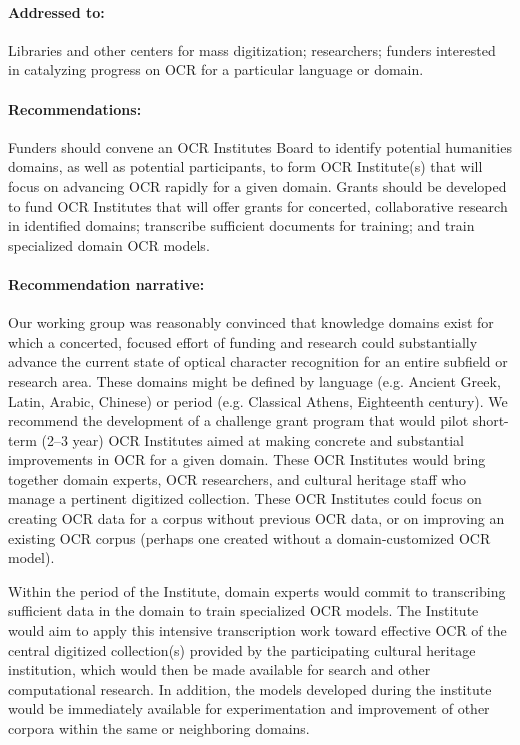 \documentclass[twoside,11pt]{report}
\begin{document}
\paragraph{Addressed to:} Libraries and other centers for mass digitization; researchers; funders interested in catalyzing progress on OCR for a particular language or domain.

\paragraph{Recommendations:} Funders should convene an OCR Institutes Board to identify potential humanities domains, as well as potential participants, to form OCR Institute(s) that will focus on advancing OCR rapidly for a given domain. Grants should be developed to fund OCR Institutes that will offer grants for concerted, collaborative research in identified domains; transcribe sufficient documents for training; and train specialized domain OCR models.

\paragraph{Recommendation narrative:}

Our working group was reasonably convinced that knowledge domains exist for which a concerted, focused effort of funding and research could substantially advance the current state of optical character recognition for an entire subfield or research area. These domains might be defined by language (e.g. Ancient Greek, Latin, Arabic, Chinese) or period (e.g. Classical Athens, Eighteenth century). We recommend the development of a challenge grant program that would pilot short-term (2--3 year) OCR Institutes aimed at making concrete and substantial improvements in OCR for a given domain. These OCR Institutes would bring together domain experts, OCR researchers, and cultural heritage staff who manage a pertinent digitized collection. These OCR Institutes could focus on creating OCR data for a corpus without previous OCR data, or on improving an existing OCR corpus (perhaps one created without a domain-customized OCR model).

Within the period of the Institute, domain experts would commit to transcribing sufficient data in the domain to train specialized OCR models. The Institute would aim to apply this intensive transcription work toward effective OCR of the central digitized collection(s) provided by the participating cultural heritage institution, which would then be made available for search and other computational research. In addition, the models developed during the institute would be immediately available for experimentation and improvement of other corpora within the same or neighboring domains.
\end{document}
